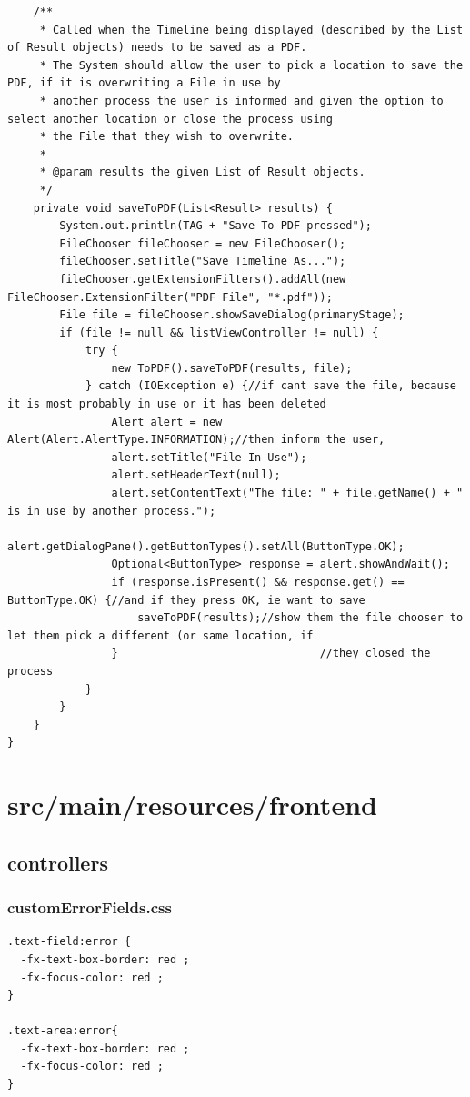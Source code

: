 \begin{lstlisting}
    /**
     * Called when the Timeline being displayed (described by the List of Result objects) needs to be saved as a PDF.
     * The System should allow the user to pick a location to save the PDF, if it is overwriting a File in use by
     * another process the user is informed and given the option to select another location or close the process using
     * the File that they wish to overwrite.
     *
     * @param results the given List of Result objects.
     */
    private void saveToPDF(List<Result> results) {
        System.out.println(TAG + "Save To PDF pressed");
        FileChooser fileChooser = new FileChooser();
        fileChooser.setTitle("Save Timeline As...");
        fileChooser.getExtensionFilters().addAll(new FileChooser.ExtensionFilter("PDF File", "*.pdf"));
        File file = fileChooser.showSaveDialog(primaryStage);
        if (file != null && listViewController != null) {
            try {
                new ToPDF().saveToPDF(results, file);
            } catch (IOException e) {//if cant save the file, because it is most probably in use or it has been deleted
                Alert alert = new Alert(Alert.AlertType.INFORMATION);//then inform the user,
                alert.setTitle("File In Use");
                alert.setHeaderText(null);
                alert.setContentText("The file: " + file.getName() + " is in use by another process.");
                alert.getDialogPane().getButtonTypes().setAll(ButtonType.OK);
                Optional<ButtonType> response = alert.showAndWait();
                if (response.isPresent() && response.get() == ButtonType.OK) {//and if they press OK, ie want to save
                    saveToPDF(results);//show them the file chooser to let them pick a different (or same location, if
                }                               //they closed the process
            }
        }
    }
}
\end{lstlisting}

\section{src/main/resources/frontend}
\subsection{controllers}
\subsubsection{customErrorFields.css}
\begin{lstlisting}
.text-field:error {
  -fx-text-box-border: red ;
  -fx-focus-color: red ;
}

.text-area:error{
  -fx-text-box-border: red ;
  -fx-focus-color: red ;
}
\end{lstlisting}
